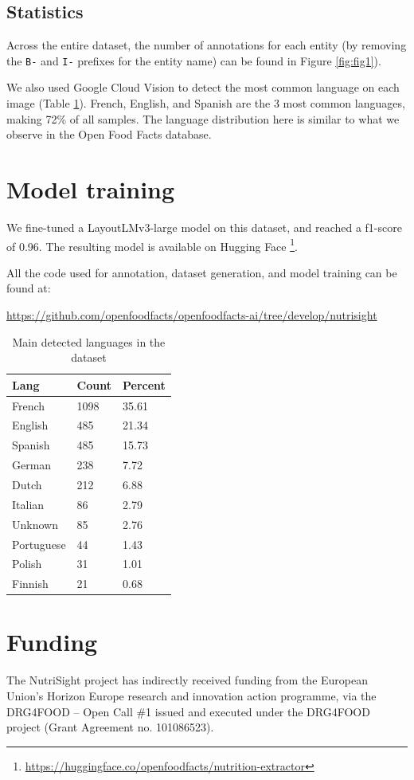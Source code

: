 \documentclass{article}
\begin{document}
\subsection{Statistics}

Across the entire dataset, the number of annotations for each entity (by removing the \verb+B-+ and \verb+I-+ prefixes for the entity name) can be found in Figure \ref{fig:fig1}).

We also used Google Cloud Vision to detect the most common language on each image (Table \ref{tab:table}). French, English, and Spanish are the 3 most common languages, making 72\% of all samples. The language distribution here is similar to what we observe in the Open Food Facts database.

\section{Model training}

We fine-tuned a LayoutLMv3-large model on this dataset, and reached a f1-score of 0.96. The resulting model is available on Hugging Face \footnote{\url{https://huggingface.co/openfoodfacts/nutrition-extractor}}.

All the code used for annotation, dataset generation, and model training can be found at:
\begin{center}
	\url{https://github.com/openfoodfacts/openfoodfacts-ai/tree/develop/nutrisight}
\end{center}

\begin{table}
	\caption{Main detected languages in the dataset}
	\centering
	\begin{tabular}{lll}
		\toprule
		Lang     & Count     & Percent \\
		\midrule
		French & 1098  & 35.61     \\
        English & 485 & 21.34 \\
        Spanish & 485 & 15.73 \\
        German & 238 & 7.72 \\
        Dutch & 212 & 6.88 \\
        Italian & 86 & 2.79 \\
        Unknown & 85 & 2.76 \\
        Portuguese & 44 & 1.43 \\
        Polish & 31 & 1.01 \\
        Finnish & 21 & 0.68 \\
		\bottomrule
	\end{tabular}
	\label{tab:table}
\end{table}

\section{Funding}

The NutriSight project has indirectly received funding from the European Union’s Horizon Europe research and innovation action programme, via the DRG4FOOD – Open Call \#1 issued and executed under the DRG4FOOD project (Grant Agreement no. 101086523).



\end{document}
